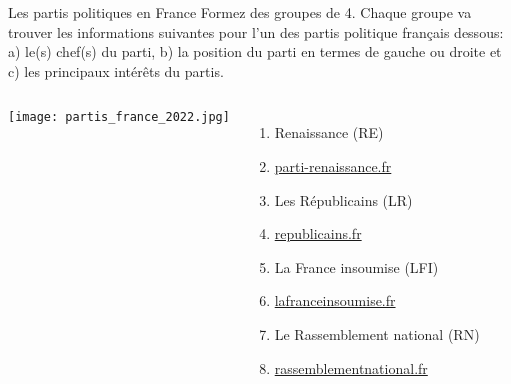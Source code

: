 \begin{frame}{Les partis politiques en France}
  \small
  Formez des groupes de 4.
  Chaque groupe va trouver les informations suivantes pour l'un des partis politique français dessous: a) le(s) chef(s) du parti, b) la position du parti en termes de gauche ou droite et c) les principaux intérêts du partis.
  \begin{columns}
      \begin{center}
        \texttt{[image: partis\_france\_2022.jpg]}
      \end{center}
      \begin{enumerate}
        \item Renaissance (RE)
        \item[] \href{https://parti-renaissance.fr/}{parti-renaissance.fr}
        \item Les Républicains (LR)
        \item[] \href{https://republicains.fr/}{republicains.fr}
        \item La France insoumise (LFI)
        \item[] \href{https://lafranceinsoumise.fr/}{lafranceinsoumise.fr}
        \item Le Rassemblement national (RN)
        \item[] \href{https://rassemblementnational.fr/}{rassemblementnational.fr}
      \end{enumerate}
  \end{columns}
\end{frame}